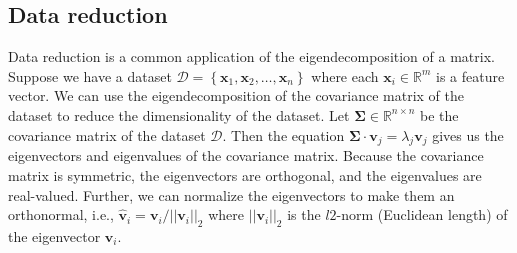 \documentclass{article}[11pt]
\def\D{\mathcal{D}}
\newcommand{\norm}[1]{\left|\left|#1\right|\right|}
\begin{document}
\subsection*{Data reduction}
Data reduction is a common application of the eigendecomposition of a matrix. Suppose we have a dataset $\D = \left\{\mathbf{x}_{1},\mathbf{x}_{2},\dots,\mathbf{x}_{n}\right\}$ where each $\mathbf{x}_{i}\in\mathbb{R}^{m}$ is a feature vector.
We can use the eigendecomposition of the covariance matrix of the dataset to reduce the dimensionality of the dataset.
Let $\mathbf{\Sigma}\in\mathbb{R}^{n\times{n}}$ be the covariance matrix of the dataset $\D$. 
Then the equation $\mathbf{\Sigma}\cdot\mathbf{v}_{j} = \lambda_{j}\mathbf{v}_{j}$ gives us the eigenvectors and eigenvalues of the covariance matrix.
Because the covariance matrix is symmetric, the eigenvectors are orthogonal, and the eigenvalues are real-valued.
Further, we can normalize the eigenvectors to make them an orthonormal, 
i.e., $\hat{\mathbf{v}}_{i} = \mathbf{v}_{i}/\norm{\mathbf{v}_{i}}_{2}$ where $\norm{\mathbf{v}_{i}}_{2}$ is the $l2$-norm (Euclidean length) of the eigenvector $\mathbf{v}_{i}$.
\end{document}
